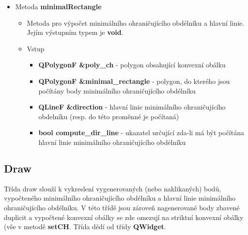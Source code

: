 \documentclass[a4paper, 12pt]{article}
\begin{document}
\begin{itemize}
	\item Metoda \textbf{minimalRectangle}
		\begin{itemize}
			\item Metoda pro výpočet minimálního ohraničujícího obdélníku a hlavní linie. Jejím výstupním typem je \textbf{void}.
			\item Vstup
				\begin{itemize}
					\item \textbf{QPolygonF \&poly\_ch} - polygon obsahující konvexní obálku
					\item \textbf{QPolygonF \&minimal\_rectangle} - polygon, do kterého jsou počítány body minimálního ohraničujícího obdélníku
					\item \textbf{QLineF \&direction} - hlavní linie minimálního ohraničujícího obdelníku (resp. do této proměnné je počítaná)
					\item \textbf{bool compute\_dir\_line} - ukazatel určující zda-li má být počítána hlavní linie minimálního ohraničujícího obdélníku
				\end{itemize}

		\end{itemize}
\end{itemize}
\clearpage

\subsection{Draw}
Třída draw slouží k vykreslení vygenerovaných (nebo naklikaných) bodů, vypočteného minimálního ohraničujícího obdélníku a hlavní linie minimálního ohraničujícího obdélníku. V této třídě jsou zároveň nagenerované body zbavené duplicit a vypočtené konvexní obálky se zde omezují na striktní konvexní obálky (vše v metodě \textbf{setCH}. Třída dědí od třídy \textbf{QWidget}. 
\end{document}
